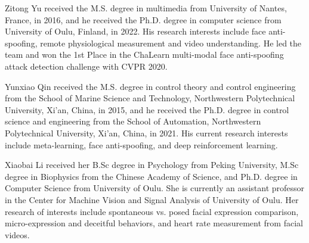 \documentclass[10pt,journal,compsoc]{IEEEtran}
\begin{document}
\begin{IEEEbiography}{Zitong Yu}
 received the M.S. degree in multimedia from University of Nantes, France, in 2016, and he received the Ph.D. degree in computer science from University of Oulu, Finland, in 2022. His research interests include face anti-spoofing, remote physiological measurement and video understanding. He led the team and won the 1st Place in the ChaLearn multi-modal face anti-spoofing attack detection challenge with CVPR 2020.
\end{IEEEbiography}





\begin{IEEEbiography}{Yunxiao Qin} received the M.S. degree in control theory and control engineering from the School of Marine Science and Technology, Northwestern Polytechnical University, Xi’an, China, in 2015, and he received the Ph.D. degree in control science and engineering from the School of Automation, Northwestern Polytechnical University, Xi’an, China, in 2021. His current research interests include meta-learning, face anti-spoofing, and deep reinforcement learning.
	\end{IEEEbiography}



\begin{IEEEbiography}{Xiaobai Li}
received her B.Sc degree in Psychology from Peking University, M.Sc degree in Biophysics from the Chinese Academy of Science, and Ph.D. degree in Computer Science from University of Oulu. She is currently an assistant professor in the Center for Machine Vision and Signal Analysis of University of Oulu. Her research of interests include spontaneous vs. posed facial expression comparison, micro-expression and deceitful behaviors, and heart rate measurement from facial videos. 
\end{IEEEbiography}
\end{document}
